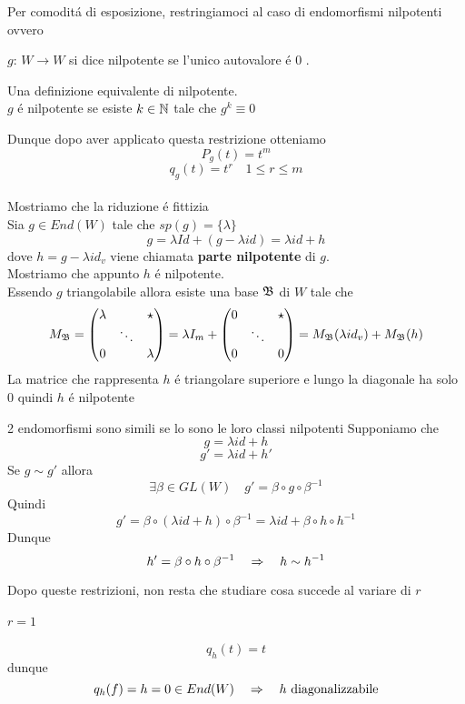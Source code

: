 Per comodit\'a di esposizione, restringiamoci al caso di endomorfismi nilpotenti ovvero

 \begin{defn}\bianco
 $g :\, W \to W $ si dice nilpotente se l'unico autovalore \'e 0 .\\
\end{defn}
\begin{oss}Una definizione equivalente di nilpotente.\\
$g $ \'e nilpotente se esiste $k\in \mathbb{N} $ tale che $g^k \equiv 0 $
\end{oss}
Dunque dopo aver applicato questa restrizione otteniamo
$$ P_g(t) = t^m $$ $$q_g(t) = t^r \quad 1\leq r \leq m  $$
\\
 Mostriamo che la riduzione \'e fittizia \\
Sia $g \in End(W) $ tale che $sp(g)=\{ \lambda \} $
$$ g= \lambda Id + (g -\lambda id) = \lambda id + h$$
dove $h=g-\lambda id_v$ viene chiamata \textbf{parte nilpotente }di $g$.\\
Mostriamo che appunto $h$ \'e nilpotente.\\
Essendo $g$ triangolabile allora esiste una base $\mathfrak{B}$ di $W$ tale che
$$ M_{\mathfrak{B}} = \begin{pmatrix}
\lambda & & \star \\ 
& \ddots & \\ 
0& & \lambda
\end{pmatrix} = \lambda I_m +  \begin{pmatrix}0 & & \star \\ 
& \ddots & \\ 
0& & 0
\end{pmatrix}  = M_{\mathfrak{B}}(\lambda id_v) + M_{\mathfrak{B}}(h)$$
La matrice che rappresenta $h$ \'e triangolare superiore e lungo la diagonale ha solo $0$ quindi $h$ \'e nilpotente 

\begin{prop} 2 endomorfismi sono simili se lo sono le loro classi nilpotenti
\proof
Supponiamo che $$ g=\lambda id + h $$
$$ g'=\lambda id + h' $$
Se $g \sim g' $ allora 
$$\exists \beta \in GL(W) \quad g'=\beta \circ g \circ \beta^{-1}$$
Quindi
$$ g' = \beta \circ ( \lambda id + h ) \circ \beta^{-1} = \lambda id + \beta \circ h \circ h^{-1}$$
Dunque $$h'= \beta \circ h \circ \beta^{-1} \quad \Rightarrow \quad h \sim h^{-1} $$
\end{prop} 
\newpage
Dopo queste restrizioni, non resta che studiare cosa succede al variare di $r$
\paragraph*{$r=1$}
$$q_h (t) =t $$ dunque $$q_h(f)= h =0 \in End(W) \quad \Rightarrow  \quad h \text{ diagonalizzabile}$$
